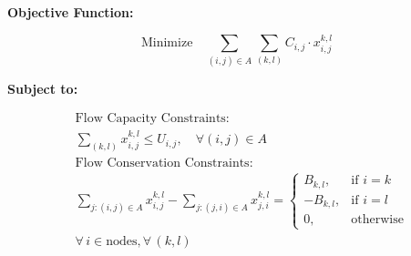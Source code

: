\documentclass{article}
\begin{document}
\textbf{Objective Function:}

\[
\text{Minimize} \quad \sum_{(i,j) \in A} \sum_{(k,l)} C_{i,j} \cdot x_{i,j}^{k,l}
\]

\textbf{Subject to:}

\begin{align*}
& \text{Flow Capacity Constraints:} \\
& \sum_{(k,l)} x_{i,j}^{k,l} \leq U_{i,j}, \quad \forall (i,j) \in A \\

& \text{Flow Conservation Constraints:} \\
& \sum_{j: (i,j) \in A} x_{i,j}^{k,l} - \sum_{j: (j,i) \in A} x_{j,i}^{k,l} = 
\begin{cases} 
B_{k,l}, & \text{if } i = k \\
-B_{k,l}, & \text{if } i = l \\
0, & \text{otherwise}
\end{cases} \\
& \forall \, i \in \text{nodes}, \forall \, (k,l)
\end{align*}
\end{document}
